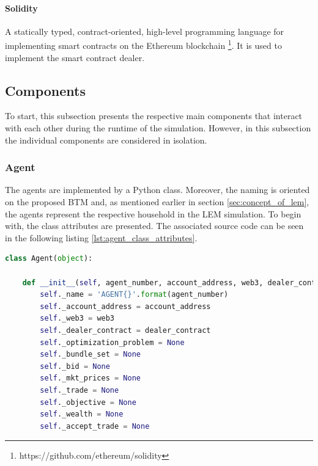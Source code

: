 \paragraph{Solidity}
A statically typed, contract-oriented, high-level programming language for implementing smart contracts on the Ethereum
blockchain \footnote{https://github.com/ethereum/solidity}.
It is used to implement the smart contract dealer. 

\clearpage
\subsection{Components}
\label{sec:components_of_simulation}
To start, this subsection presents the respective main components 
that interact with each other during the runtime of the simulation.
However, in this subsection the individual components are considered in isolation.

\subsubsection{Agent}
\label{sec:agent_class}
The agents are implemented by a Python class. Moreover, the naming is oriented on the proposed BTM and,
as mentioned earlier in section \ref{sec:concept_of_lem}, the agents represent the respective household 
in the LEM simulation.
To begin with, the class attributes are presented. 
The associated source code can be seen in the following listing \ref{lst:agent_class_attributes}.

\begin{lstlisting}[label=lst:agent_class_attributes, caption=Overview of the agent class attributes, language=Python]
    class Agent(object):

    def __init__(self, agent_number, account_address, web3, dealer_contract):
        self._name = 'AGENT{}'.format(agent_number)
        self._account_address = account_address
        self._web3 = web3
        self._dealer_contract = dealer_contract
        self._optimization_problem = None
        self._bundle_set = None
        self._bid = None
        self._mkt_prices = None
        self._trade = None
        self._objective = None
        self._wealth = None
        self._accept_trade = None
\end{lstlisting}

